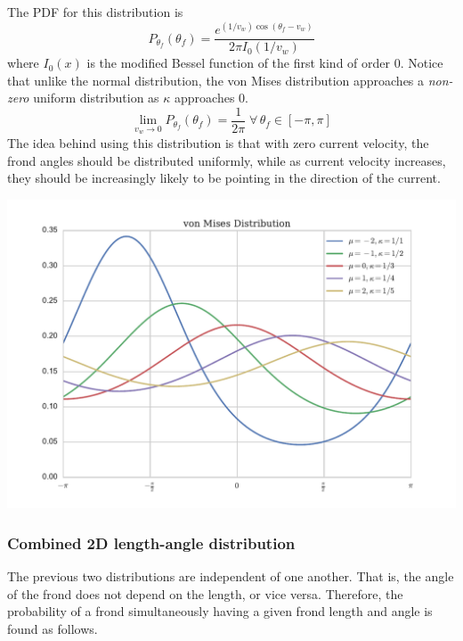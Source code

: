 \documentclass[10pt]{article}
\newenvironment{mcfig}
	{\par\medskip\noindent\minipage{\linewidth}}
	{\endminipage\par\medskip}
\begin{document}
\begin{multicols}{2}
The PDF for this distribution is
\begin{equation}
	P_{\theta_f}(\theta_f) = \frac{e^{(1/v_w)\cos(\theta_f-v_w)}}{2\pi I_0(1/v_w)}
\end{equation}
where $I_0(x)$ is the modified Bessel function of the first kind of order 0.
Notice that unlike the normal distribution, the von Mises distribution approaches a \textit{non-zero} uniform distribution as $\kappa$ approaches 0.
\begin{equation}
	\displaystyle \lim_{v_w \to 0}P_{\theta_f}(\theta_f) = \frac{1}{2\pi} \;\forall\, \theta_f \in [-\pi,\pi]
\end{equation}
The idea behind using this distribution is that with zero current velocity, the frond angles should be distributed uniformly, while as current velocity increases, they should be increasingly likely to be pointing in the direction of the current.

\begin{mcfig}
	\centering
	\includegraphics[width=\linewidth]{vonmises_2}
	\label{fig:vonmises}
\end{mcfig}

\subsubsection{Combined 2D length-angle distribution}
\label{sec:2d_dist}
The previous two distributions are independent of one another. That is, the angle of the frond does not depend on the length, or vice versa.
Therefore, the probability of a frond simultaneously having a given frond length and angle is found as follows.


\end{multicols}
\end{document}
